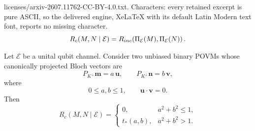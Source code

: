 \documentclass[10pt,a4paper]{amsart}
\begin{document}
licenses/arxiv-2607.11762-CC-BY-4.0.txt. Characters: every retained excerpt is pure ASCII, so the delivered engine, XeLaTeX with its default Latin Modern text font, reports no missing character.
\begin{equation}
R_c(M,N\mid\mathcal E)
=
R_{\rm inc}\!\left(
\Pi_{\mathcal E}(M),
\Pi_{\mathcal E}(N)
\right).
\label{eq:projection_robustness_reduction}
\end{equation}

\begin{theorem}
\label{thm:orthogonal_projected_robustness}
Let $\mathcal E$ be a unital qubit channel. Consider two unbiased binary POVMs whose canonically projected Bloch vectors are
\[
P_{K^\perp}\mathbf m=a\,\mathbf u,
\qquad
P_{K^\perp}\mathbf n=b\,\mathbf v,
\]
where
\[
0\le a,b\le1,
\qquad
\mathbf u\cdot\mathbf v=0.
\]
Then
\begin{equation}
R_c(M,N\mid\mathcal E)
=
\begin{cases}
0,
& a^2+b^2\le1,\\[1ex]
t_*(a,b),
& a^2+b^2>1.
\end{cases}
\label{eq:orthogonal_projected_robustness}
\end{equation}
\end{theorem}
\end{document}
